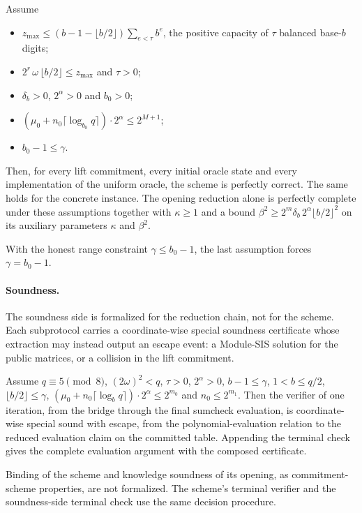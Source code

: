 \begin{theorem}\label{thm:hachi_correctness}
\leanok
{}
Assume
\begin{itemize}
  \item $z_{\max}\leq(b-1-\lfloor b/2\rfloor)\sum_{e<\tau}b^{e}$, the positive capacity of
    $\tau$ balanced base-$b$ digits;
  \item $2^{r}\,\omega\,\lfloor b/2\rfloor\leq z_{\max}$ and $\tau>0$;
  \item $\delta_b>0$, $2^\alpha>0$ and $b_0>0$;
  \item $(\mu_0+n_0\lceil\log_{b_0}q\rceil)\cdot 2^{\alpha}\leq 2^{M+1}$;
  \item $b_0-1\leq\gamma$.
\end{itemize}
Then, for every lift commitment, every initial oracle state and every implementation of the
uniform oracle, the scheme is perfectly correct. The same holds for the concrete instance.
The opening reduction alone is perfectly complete under these assumptions together with
$\kappa\geq 1$ and a bound $\beta^2\geq 2^m\delta_b\,2^\alpha\lfloor b/2\rfloor^2$ on its
auxiliary parameters $\kappa$ and $\beta^2$.
\end{theorem}

With the honest range constraint $\gamma\leq b_0-1$, the last assumption forces
$\gamma=b_0-1$.

\paragraph{Soundness.}
The soundness side is formalized for the reduction chain, not for the scheme. Each
subprotocol carries a coordinate-wise special soundness certificate whose extraction may
instead output an escape event: a Module-SIS solution for the public matrices, or a
collision in the lift commitment.

\begin{theorem}\label{thm:hachi_iteration_cwss}
\leanok
Assume $q\equiv 5\pmod 8$, $(2\omega)^2<q$, $\tau>0$, $2^\alpha>0$, $b-1\leq\gamma$,
$1<b\leq q/2$, $\lfloor b/2\rfloor\leq\gamma$,
$(\mu_0+n_0\lceil\log_b q\rceil)\cdot 2^{\alpha}\leq 2^{m_0}$ and $n_0\leq 2^{m_1}$. Then the
verifier of one iteration, from the bridge through the final sumcheck evaluation, is
coordinate-wise special sound with escape, from the polynomial-evaluation relation to the
reduced evaluation claim on the committed table. Appending the terminal check gives the
complete evaluation argument with the composed certificate.
\end{theorem}

Binding of the scheme and knowledge soundness of its opening, as commitment-scheme properties,
are not formalized. The scheme's terminal verifier and the soundness-side terminal check use
the same decision procedure.
